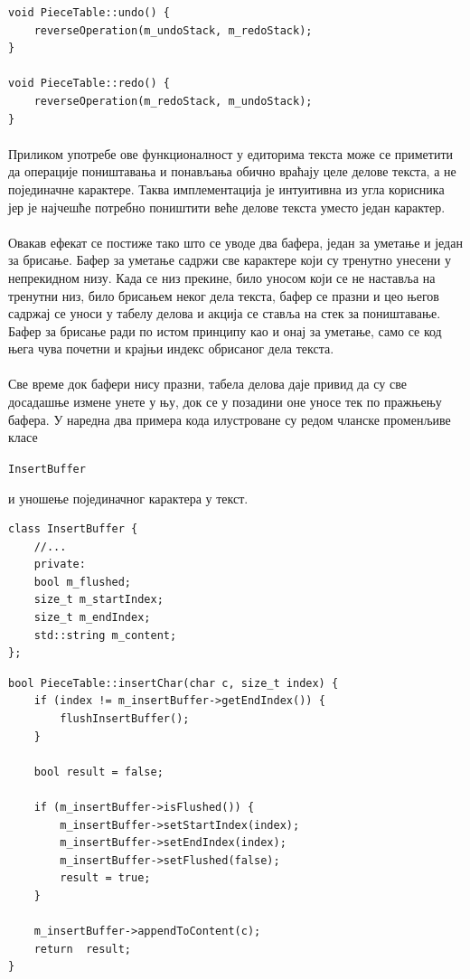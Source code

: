 \documentclass[12pt,oneside]{memoir}
\begin{document}
\begin{verbatim}
void PieceTable::undo() {
	reverseOperation(m_undoStack, m_redoStack);
}

void PieceTable::redo() {
	reverseOperation(m_redoStack, m_undoStack);
}
\end{verbatim}

\paragraph{}
Приликом употребе ове функционалност у едиторима текста може се приметити да 
операције поништавања и понављања обично враћају целе делове текста, а не појединачне карактере. Таква имплементација је интуитивна из угла корисника јер
је најчешће потребно поништити веће делове текста уместо један карактер.

\paragraph{}
Овакав ефекат се постиже тако што се уводе два бафера, један за уметање и један
за брисање. Бафер за уметање садржи све карактере који су тренутно унесени у 
непрекидном низу. Када се низ прекине, било уносом који се не наставља на тренутни
низ, било брисањем неког дела текста, бафер се празни и цео његов садржај се уноси
у табелу делова и акција се ставља на стек за поништавање. 
Бафер за брисање ради по истом принципу као и онај за уметање, само се код њега
чува почетни и крајњи индекс обрисаног дела текста.

\paragraph{}
Све време док бафери нису празни, табела делова даје привид да су све досадашње
измене унете у њу, док се у позадини оне уносе тек по пражњењу бафера. У наредна
два примера кода илустроване су редом чланске променљиве класе \begin{latinica}
\verb|InsertBuffer|\end{latinica} и уношење појединачног карактера у текст.

\begin{verbatim}
class InsertBuffer {
	//...
	private:
	bool m_flushed;
	size_t m_startIndex;
	size_t m_endIndex;
	std::string m_content;
};
\end{verbatim}

\begin{verbatim}
bool PieceTable::insertChar(char c, size_t index) {
	if (index != m_insertBuffer->getEndIndex()) {
		flushInsertBuffer();
	}
	
	bool result = false;
	
	if (m_insertBuffer->isFlushed()) {
		m_insertBuffer->setStartIndex(index);
		m_insertBuffer->setEndIndex(index);
		m_insertBuffer->setFlushed(false);
		result = true;
	}
	
	m_insertBuffer->appendToContent(c);
	return  result;
}
\end{verbatim}
\end{document}
